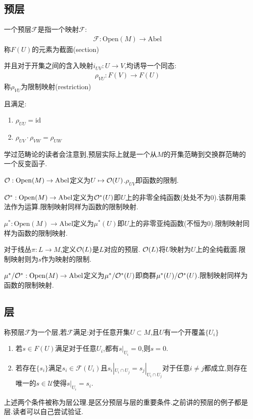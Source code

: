 \subsection*{预层}
\begin{definition}
	一个预层$\mathcal{F}$是指一个映射$\mathcal{F}$:
	\begin{align*}
		\mathcal{F}:\mathrm{Open}(M) \to \mathrm{Abel}
	\end{align*}
    称$F(U)$的元素为截面(section)

	并且对于开集之间的含入映射$i_{UV}:U \to V$,均诱导一个同态:
	\begin{align*}
		\rho_{VU}:F(V)\to F(U)
	\end{align*}
   称$\rho_{VU}$为限制映射(restriction)

   且满足:
   \begin{enumerate}
	\item $\rho_{UU}=\mathrm{id}$
	\item $\rho_{UV}\cdot \rho_{VW}=\rho_{UW}$
   \end{enumerate}
\end{definition}
学过范畴论的读者会注意到,预层实际上就是一个从$M$的开集范畴到交换群范畴的一个反变函子.

\begin{example}[函数层]
	$\mathcal{O}:\mathrm{Open}(M) \to \mathrm{Abel}$定义为$U\mapsto \mathcal{O}(U)$.$\rho_{UV}$即函数的限制.

	$\mathcal{O}^*:\mathrm{Open}(M) \to \mathrm{Abel}$定义为$\mathcal{O}^*(U)$即$U$上的非零全纯函数(处处不为$0$).该群用乘法作为运算.限制映射同样为函数的限制映射.

	$\mu^*:\mathrm{Open}(M) \to \mathrm{Abel}$定义为$\mu^*(U)$即$U$上的非零亚纯函数(不恒为$0$).限制映射同样为函数的限制映射.
\end{example}

\begin{example}
	对于线丛$\pi:L \to M$,定义$\mathcal{O}(L)$是$L$对应的预层.
$\mathcal{O}(L)$将$U$映射为$U$上的全纯截面.限制映射则为$s$作为映射的限制.
\end{example}
\begin{example}
	$\mu^*/\mathcal{O}^*:\mathrm{Open}(M) \to \mathrm{Abel}$定义为$\mu^*/\mathcal{O}^*(U)$即商群$\mu^*(U)/\mathcal{O}^*(U)$.限制映射同样为函数的限制映射.
\end{example}

\subsection*{层}
\begin{definition}
	称预层$\mathcal{F}$为一个层,若$\mathcal{F}$满足:对于任意开集$U \subset M$,且$U$有一个开覆盖$\{U_i\}$
	\begin{enumerate}
		\item 若$s \in F(U)$满足对于任意$U_i$,都有$s|_{U_i}=0$,则$s=0$.
		\item 若存在$\{s_i\}$满足$s_i\in \mathcal{F}(U_i)$且$s_i|_{U_i\cap U_j}=s_j|_{U_i\cap U_j}$对于任意$i\neq j$都成立,则存在唯一的$s\in \mathcal{U}$使得$s|_{U_i}=s_i$.
	\end{enumerate}
\end{definition}
上述两个条件被称为层公理.是区分预层与层的重要条件.之前讲的预层的例子都是层.读者可以自己尝试验证.

